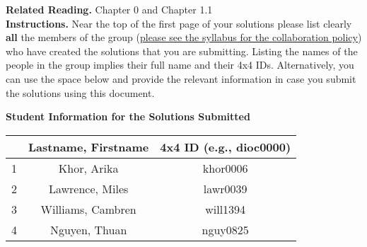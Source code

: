 \noindent\textbf{Related Reading.} Chapter 0 and Chapter 1.1\\
\noindent\textbf{Instructions.} Near the top of the first page of your solutions please list clearly \textbf{all} the members of the group (\underline{please see the syllabus for the collaboration policy}) who have created the solutions that you are submitting. Listing the names of the people in the group implies their full name and their 4x4 IDs.
Alternatively, you can use the space below and provide the relevant information 
in case you submit the solutions using this document.\\ 
\noindent\makebox[\linewidth]{\rule{\columnwidth}{2pt}}


\begin{center}
\textbf{Student Information for the Solutions Submitted}
\end{center}

\begin{center}
\begin{tabular}{c|c|c|}
\cline{2-3}
 & Lastname, Firstname & 4x4 ID (e.g., dioc0000) \\
\hline
\multicolumn{1}{|c|}{1} & Khor, Arika & khor0006 \\
\hline
\multicolumn{1}{|c|}{2} & Lawrence, Miles & lawr0039 \\
\hline
\multicolumn{1}{|c|}{3} & Williams, Cambren & will1394 \\
\hline
\multicolumn{1}{|c|}{4} & Nguyen, Thuan & nguy0825 \\
\hline
\end{tabular}

\end{center}

\thispagestyle{empty}






